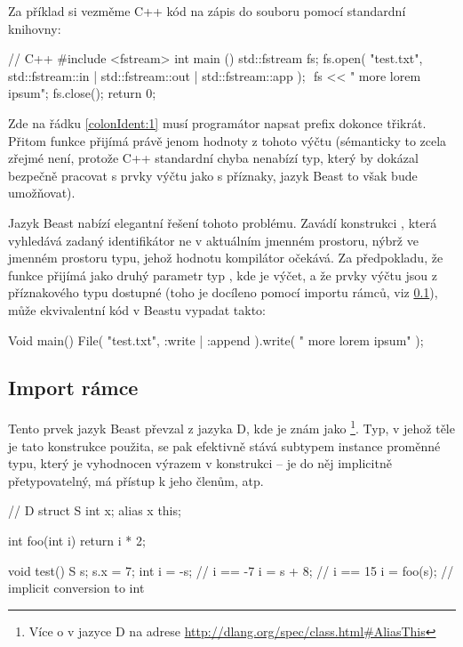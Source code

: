 Za příklad si vezměme C++ kód na zápis do souboru pomocí standardní knihovny:
\begin{cppcode}
// C++
#include <fstream>
int main () {
	std::fstream fs;
	fs.open( "test.txt", std::fstream::in | std::fstream::out | std::fstream::app ); $\label{colonIdent:1}$
	fs << " more lorem ipsum";
	fs.close();
	return 0;
}
\end{cppcode}

Zde na řádku \ref{colonIdent:1} musí programátor napsat prefix  dokonce třikrát. Přitom funkce  přijímá právě jenom hodnoty z tohoto výčtu (sémanticky to zcela zřejmé není, protože C++ standardní chyba nenabízí typ, který by dokázal bezpečně pracovat s prvky výčtu jako s příznaky, jazyk Beast to však bude umožňovat).

Jazyk Beast nabízí elegantní řešení tohoto problému. Zavádí konstrukci , která vyhledává zadaný identifikátor ne v aktuálním jmenném prostoru, nýbrž ve jmenném prostoru typu, jehož hodnotu kompilátor očekává. Za předpokladu, že funkce  přijímá jako druhý parametr typ , kde  je výčet, a že prvky výčtu jsou z příznakového typu dostupné (toho je docíleno pomocí importu rámců, viz \ref{scopeImport}), může ekvivalentní kód v Beastu vypadat takto:
\begin{code}
Void main() {
	File( "test.txt", :write | :append ).write( " more lorem ipsum" );
}
\end{code}

\subsection{Import rámce} \label{scopeImport}
Tento prvek jazyk Beast převzal z jazyka D, kde je znám jako \footnote{Více o  v jazyce D na adrese \url{http://dlang.org/spec/class.html\#AliasThis}}. Typ, v jehož těle je tato konstrukce použita, se pak efektivně stává subtypem instance proměnné typu, který je vyhodnocen výrazem v konstrukci -- je do něj implicitně přetypovatelný, má přístup k jeho členům, atp.

\begin{dcode}
// D
struct S
{
	int x;
	alias x this;
}

int foo(int i) { return i * 2; }

void test()
{
	S s;
	s.x = 7;
	int i = -s;  // i == -7
	i = s + 8;   // i == 15
	i = foo(s);  // implicit conversion to int
}
\end{dcode}

